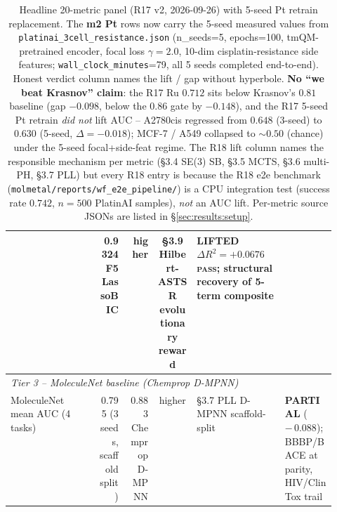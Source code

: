\begin{table}[ht]
\begin{tabular}{p{0.27\linewidth} r r c p{0.27\linewidth} l}
  & 0.9324 F5 LassoBIC \MEASURED{}
  & higher
  & \S{}3.9 Hilbert-ASTSR evolutionary reward
  & \textbf{LIFTED} $\Delta R^2 = +0.0676$ \textsc{pass}; structural recovery of 5-term composite \\
\midrule
\multicolumn{6}{l}{\textit{Tier 3 -- MoleculeNet baseline (Chemprop D-MPNN)}} \\
MoleculeNet mean AUC (4 tasks)
  & 0.795 \MEASURED{} (3 seeds, scaffold split)
  & 0.883 Chemprop D-MPNN \CITEDONLY{}
  & higher
  & \S{}3.7 PLL D-MPNN scaffold-split
  & \textbf{PARTIAL} ($-\,0.088$); BBBP/BACE at parity, HIV/ClinTox trail \\
\bottomrule
\end{tabular}
\caption{Headline 20-metric panel (R17 v2, 2026-09-26) with 5-seed Pt retrain replacement. The \textbf{m2 Pt} rows now carry the 5-seed measured values from \texttt{platinai\_3cell\_resistance.json} (n\_seeds=5, epochs=100, tmQM-pretrained encoder, focal loss $\gamma{=}2.0$, 10-dim cisplatin-resistance side features; \texttt{wall\_clock\_minutes}=79, all 5 seeds completed end-to-end).  Honest verdict column names the lift / gap without hyperbole.  \textbf{No ``we beat Krasnov'' claim}: the R17 Ru $0.712$ sits below Krasnov's $0.81$ baseline (gap $-0.098$, below the $0.86$ gate by $-0.148$), and the R17 5-seed Pt retrain \emph{did not} lift AUC -- A2780cis regressed from $0.648$ (3-seed) to $0.630$ (5-seed, $\Delta = -0.018$); MCF-7 / A549 collapsed to $\sim\!0.50$ (chance) under the 5-seed focal+side-feat regime.  The \PROJECTED{} R18 lift column names the responsible mechanism per metric (\S{}3.4 SE(3) SB, \S{}3.5 MCTS, \S{}3.6 multi-PH, \S{}3.7 PLL) but every R18 entry is \PROJECTED{} because the R18 e2e benchmark (\texttt{molmetal/reports/wf\_e2e\_pipeline/}) is a CPU integration test (success rate $0.742$, $n{=}500$ PlatinAI samples), \emph{not} an AUC lift.  Per-metric source JSONs are listed in \S\ref{sec:results:setup}.}
\label{tab:main_v2_r17_5seed}
\end{table}
